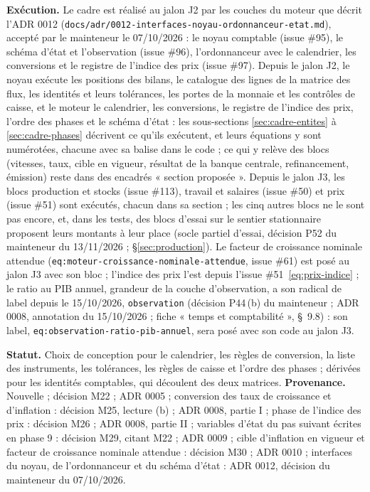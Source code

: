 \documentclass[11pt,a4paper]{article}
\begin{document}
\textbf{Exécution.} Le cadre est réalisé au jalon J2 par les couches du moteur que décrit l'ADR 0012 (\nolinkurl{docs/adr/0012-interfaces-noyau-ordonnanceur-etat.md}), accepté par le mainteneur le 07/10/2026 : le noyau comptable (issue \#95), le schéma d'état et l'observation (issue \#96), l'ordonnanceur avec le calendrier, les conversions et le registre de l'indice des prix (issue \#97). Depuis le jalon J2, le noyau exécute les positions des bilans, le catalogue des lignes de la matrice des flux, les identités et leurs tolérances, les portes de la monnaie et les contrôles de caisse, et le moteur le calendrier, les conversions, le registre de l'indice des prix, l'ordre des phases et le schéma d'état : les sous-sections \ref{sec:cadre-entites} à \ref{sec:cadre-phases} décrivent ce qu'ils exécutent, et leurs équations y sont numérotées, chacune avec sa balise dans le code ; ce qui y relève des blocs (vitesses, taux, cible en vigueur, résultat de la banque centrale, refinancement, émission) reste dans des encadrés « section proposée ». Depuis le jalon J3, les blocs production et stocks (issue \#113), travail et salaires (issue \#50) et prix (issue \#51) sont exécutés, chacun dans sa section ; les cinq autres blocs ne le sont pas encore, et, dans les tests, des blocs d'essai sur le sentier stationnaire proposent leurs montants à leur place (socle partiel d'essai, décision P52 du mainteneur du 13/11/2026 ; \S\ref{sec:production}). Le facteur de croissance nominale attendue (\texttt{eq:moteur-croissance-nominale-attendue}, issue \#61) est posé au jalon J3 avec son bloc ; l'indice des prix l'est depuis l'issue \#51~\eqref{eq:prix-indice} ; le ratio au PIB annuel, grandeur de la couche d'observation, a son radical de label depuis le 15/10/2026, \texttt{observation} (décision P44\,(b) du mainteneur ; ADR 0008, annotation du 15/10/2026 ; fiche « temps et comptabilité », \S~9.8) : son label, \texttt{eq:observation-ratio-pib-annuel}, sera posé avec son code au jalon J3.

\textbf{Statut.} Choix de conception pour le calendrier, les règles de conversion, la liste des instruments, les tolérances, les règles de caisse et l'ordre des phases ; dérivées pour les identités comptables, qui découlent des deux matrices. \textbf{Provenance.} Nouvelle ; décision M22 ; ADR 0005 ; conversion des taux de croissance et d'inflation : décision M25, lecture (b) ; ADR 0008, partie I ; phase de l'indice des prix : décision M26 ; ADR 0008, partie II ; variables d'état du pas suivant écrites en phase 9 : décision M29, citant M22 ; ADR 0009 ; cible d'inflation en vigueur et facteur de croissance nominale attendue : décision M30 ; ADR 0010 ; interfaces du noyau, de l'ordonnanceur et du schéma d'état : ADR 0012, décision du mainteneur du 07/10/2026.
\end{document}
